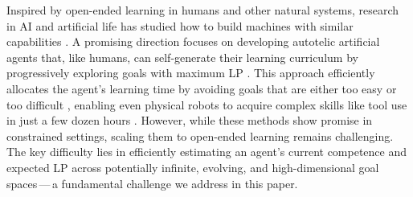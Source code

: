 Inspired by open-ended learning in humans and other natural systems, research in AI and artificial life has studied how to build machines with similar capabilities \citep{schmidhuber_powerplay_2013, jiang2023general, Sigaud2023ADO}. A promising direction focuses on developing autotelic artificial agents that, like humans, can self-generate their learning curriculum by progressively exploring goals with maximum LP \cite{baranes_active_2013, colas_autotelic_2022}. This approach efficiently allocates the agent's learning time by avoiding goals that are either too easy or too difficult \cite{portelas_automatic_2020,romac_teachmyagent_2021}, enabling even physical robots to acquire complex skills like tool use in just a few dozen hours \cite{forestier_intrinsically_2022}. However, while these methods show promise in constrained settings, scaling them to open-ended learning remains challenging. The key difficulty lies in efficiently estimating an agent's current competence and expected LP across potentially infinite, evolving, and high-dimensional goal spaces\,---\,a fundamental challenge we address in this paper.


